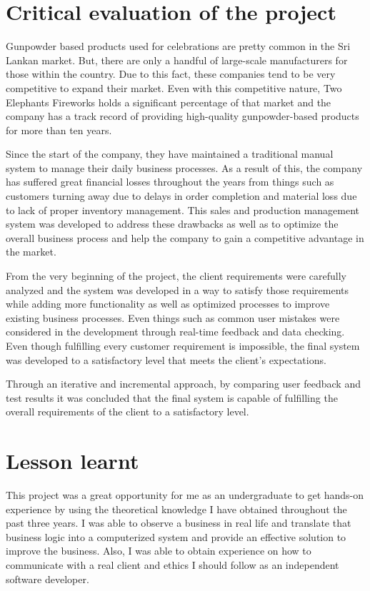 \documentclass[12pt]{report}
\begin{document}
\section{Critical evaluation of the project}
Gunpowder based products used for celebrations are pretty common in the Sri Lankan market. But, there are only a handful of large-scale manufacturers for those within the country. Due to this fact, these companies tend to be very competitive to expand their market. Even with this competitive nature, Two Elephants Fireworks holds a significant percentage of that market and the company has a track record of providing high-quality gunpowder-based products for more than ten years.

Since the start of the company, they have maintained a traditional manual system to manage their daily business processes. As a result of this, the company has suffered great financial losses throughout the years from things such as customers turning away due to delays in order completion and material loss due to lack of proper inventory management. This sales and production management system was developed to address these drawbacks as well as to optimize the overall business process and help the company to gain a competitive advantage in the market.

From the very beginning of the project, the client requirements were carefully analyzed and the system was developed in a way to satisfy those requirements while adding more functionality as well as optimized processes to improve existing business processes. Even things such as common user mistakes were considered in the development through real-time feedback and data checking. Even though fulfilling every customer requirement is impossible, the final system was developed to a satisfactory level that meets the client's expectations.

Through an iterative and incremental approach, by comparing user feedback and test results it was concluded that the final system is capable of fulfilling the overall requirements of the client to a satisfactory level.

\section{Lesson learnt}
This project was a great opportunity for me as an undergraduate to get hands-on experience by using the theoretical knowledge I have obtained throughout the past three years. I was able to observe a business in real life and translate that business logic into a computerized system and provide an effective solution to improve the business. Also, I was able to obtain experience on how to communicate with a real client and ethics I should follow as an independent software developer.
\end{document}
